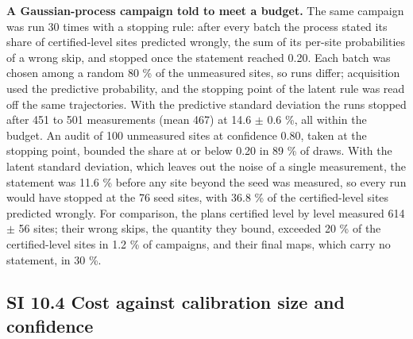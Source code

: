 \documentclass{iopjournal}
\begin{document}
\textbf{A Gaussian-process campaign told to meet a budget.} The same campaign was run 30 times with a stopping rule: after every batch the process stated its share of certified-level sites predicted wrongly, the sum of its per-site probabilities of a wrong skip, and stopped once the statement reached 0.20. Each batch was chosen among a random 80 \% of the unmeasured sites, so runs differ; acquisition used the predictive probability, and the stopping point of the latent rule was read off the same trajectories. With the predictive standard deviation the runs stopped after 451 to 501 measurements (mean 467) at 14.6 \ensuremath{\pm} 0.6 \%, all within the budget. An audit of 100 unmeasured sites at confidence 0.80, taken at the stopping point, bounded the share at or below 0.20 in 89 \% of draws. With the latent standard deviation, which leaves out the noise of a single measurement, the statement was 11.6 \% before any site beyond the seed was measured, so every run would have stopped at the 76 seed sites, with 36.8 \% of the certified-level sites predicted wrongly. For comparison, the plans certified level by level measured 614 \ensuremath{\pm} 56 sites; their wrong skips, the quantity they bound, exceeded 20 \% of the certified-level sites in 1.2 \% of campaigns, and their final maps, which carry no statement, in 30 \%.

\hypertarget{si-10.4-cost-against-calibration-size-and-confidence}{%
\subsection*{SI 10.4 Cost against calibration size and confidence}\label{si-10.4-cost-against-calibration-size-and-confidence}}
\end{document}
